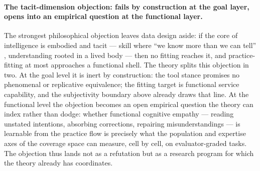 \documentclass[10pt]{article}
\begin{document}
\paragraph{The tacit-dimension objection: fails by construction at the goal layer, opens into an empirical question at the functional layer.}
The strongest philosophical objection leaves data design aside: if the core of intelligence is embodied and tacit --- skill where ``we know more than we can tell'' \cite{polanyi1966tacit}, understanding rooted in a lived body \cite{dreyfus1992what} --- then no fitting reaches it, and practice-fitting at most approaches a functional shell. The theory splits this objection in two. At the goal level it is inert by construction: the tool stance promises no phenomenal or replicative equivalence; the fitting target is functional service capability, and the subjectivity boundary above already draws that line. At the functional level the objection becomes an open empirical question the theory can index rather than dodge: whether functional cognitive empathy --- reading unstated intentions, absorbing corrections, repairing misunderstandings --- is learnable from the practice flow is precisely what the population and expertise axes of the coverage space can measure, cell by cell, on evaluator-graded tasks. The objection thus lands not as a refutation but as a research program for which the theory already has coordinates.
\end{document}
